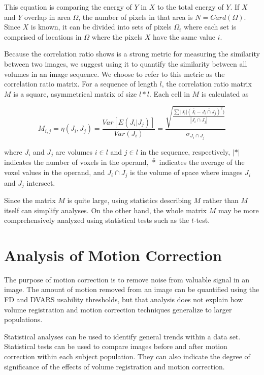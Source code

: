 This equation is comparing the energy of $Y$ in $X$ to the total energy of $Y$. If $X$ and $Y$ overlap in area $\Omega$, the number of pixels in that area is $N = Card(\Omega)$. Since $X$ is known, it can be divided into sets of pixels $\Omega_i$ where each set is comprised of locations in $\Omega$ where the pixels $X$ have the same value $i$. 

Because the correlation ratio shows is a strong metric for measuring the similarity between two images, we suggest using it to quantify the similarity between all volumes in an image sequence. We choose to refer to this metric as the correlation ratio matrix. For a sequence of length $l$, the correlation ratio matrix $M$ is a square, asymmetrical matrix of size $l*l$. Each cell in $M$ is calculated as

\begin{equation}
M_{i,j} = \eta(J_i, J_j) = \frac{Var[E(J_i|J_j)]}{Var(J_i)} =  \frac{\sqrt{\frac{\sum |J_i|(\overline{J_i} - \overline{J_i \cap J_j})^2)}{|J_i \cap J_j|}}}{\sigma_{J_i \cap J_j}}
\end{equation}

\noindent where $J_i$ and $J_j$ are volumes $i \in l$ and $j \in l$ in the sequence, respectively, $|*|$ indicates the number of voxels in the operand, $\overline{*}$ indicates the average of the voxel values in the operand, and $J_i \cap J_j$ is the volume of space where images $J_i$ and $J_j$ intersect. %

Since the matrix $M$ is quite large, using statistics describing $M$ rather than $M$ itself can simplify analyses. On the other hand, the whole matrix $M$ may be more comprehensively analyzed using statistical tests such as the $t$-test.

\section{Analysis of Motion Correction}

The purpose of motion correction is to remove noise from valuable signal in an image. The amount of motion removed from an image can be quantified using the FD and DVARS usability thresholds, but that analysis does not explain how volume registration and motion correction techniques generalize to larger populations. 

Statistical analyses can be used to identify general trends within a data set. Statistical tests can be used to compare images before and after motion correction within each subject population. They can also indicate the degree of significance of the effects of volume registration and motion correction. 

